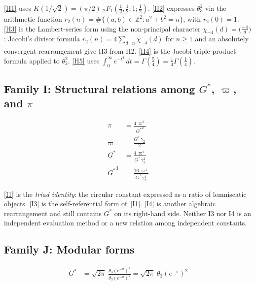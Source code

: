 \documentclass[12pt,reqno]{amsart}
\theoremstyle{definition}
\theoremstyle{remark}
\newcommand{\ZZ}{\mathbb{Z}}
\newcommand{\Gstar}{G^{\!*}}
\newcommand{\varpiup}{\varpi}
\begin{document}
\noindent
\eqref{H1} uses $K(1/\!\sqrt{2})=(\pi/2)\;
{}_{2}F_{1}(\tfrac12,\tfrac12;1;\tfrac12)$.
\eqref{H2} expresses $\theta_{3}^{2}$ via the arithmetic function
$r_{2}(n)=\#\{(a,b)\in\ZZ^{2}:a^{2}+b^{2}=n\}$, with $r_2(0)=1$.
\eqref{H3} is the Lambert-series form using the non-principal character
$\chi_{-4}(d)=\bigl(\frac{-4}{d}\bigr)$: Jacobi's divisor formula
$r_2(n)=4\sum_{d\mid n}\chi_{-4}(d)$ for $n\geq1$ and an absolutely
convergent rearrangement give H3 from H2.
\eqref{H4} is the Jacobi triple-product formula applied to $\theta_{3}^{2}$.
\eqref{H5} uses $\int_{0}^{\infty}e^{-t^{4}}\,dt=\Gamma(\tfrac54)=\tfrac14\Gamma(\tfrac14)$.

\subsection{Family I: Structural relations among \texorpdfstring{$\Gstar$, $\varpiup$, and $\pi$}{G*, varpi, and pi}}\label{sec:I}

\begin{align}
  \pi &= \frac{4\,\varpiup^{2}}{{\Gstar}^{2}}
    \tag{I1}\label{I1}\\[5pt]
  \varpiup &= \frac{{\Gstar}\,\gamma_{2}}{2}
    \tag{I2}\label{I2}\\[5pt]
  {\Gstar} &= \frac{4\,\varpiup^{2}}{{\Gstar}\,\gamma_{2}^{2}}
    \tag{I3}\label{I3}\\[5pt]
  {\Gstar}^{3} &= \frac{16\,\varpiup^{4}}
    {{\Gstar}\,\gamma_{2}^{4}}
    \tag{I4}\label{I4}
\end{align}

\noindent
\eqref{I1} is the \emph{triad identity}: the circular constant expressed
as a ratio of lemniscatic objects.
\eqref{I3} is the self-referential form of~\eqref{I1}.
\eqref{I4} is another algebraic rearrangement and still contains
$\Gstar$ on its right-hand side. Neither I3 nor I4 is an independent
evaluation method or a new relation among independent constants.

\subsection{Family J: Modular forms}\label{sec:J}

\begin{align}
  {\Gstar} &= \sqrt{2\pi}\;\frac{\theta_{3}(e^{-\pi})^{4}}
    {\theta_{3}(e^{-\pi})^{2}}
    = \sqrt{2\pi}\;\theta_{3}(e^{-\pi})^{2}
    \tag{J1}\label{J1}
\end{align}
\end{document}
